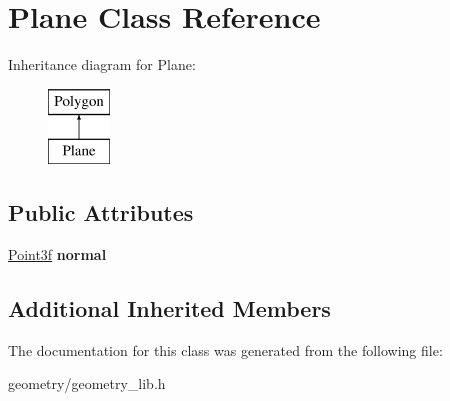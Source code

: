 \hypertarget{class_plane}{}\section{Plane Class Reference}
\label{class_plane}
Inheritance diagram for Plane\+:\begin{figure}[H]
\begin{center}
\leavevmode
\includegraphics[height=2.000000cm]{class_plane}
\end{center}
\end{figure}
\subsection*{Public Attributes}
\begin{DoxyCompactItemize}
\item 
\mbox{\label{class_plane_a0750005b0807c5ca32c264556d83a5d4}} 
\mbox{\hyperlink{struct_point3f}{Point3f}} {\bfseries normal}
\end{DoxyCompactItemize}
\subsection*{Additional Inherited Members}


The documentation for this class was generated from the following file\+:\begin{DoxyCompactItemize}
\item 
geometry/geometry\+\_\+lib.\+h\end{DoxyCompactItemize}
